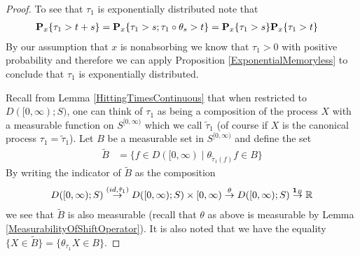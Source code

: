\begin{proof}
To see that $\tau_1$ is exponentially distributed note that
\begin{align*}
\sprobability{\tau_1 > t+s}{x} &= \sprobability{\tau_1 > s; \tau_1
  \circ \theta_s > t}{x} = \sprobability{\tau_1 > s}{x} \sprobability{\tau_1 > t}{x} 
\end{align*}
By our assumption that $x$ is nonabsorbing we know that $\tau_1 > 0$
with positive probability and therefore we can apply Proposition
\ref{ExponentialMemoryless} to conclude that $\tau_1$ is
exponentially distributed.

Recall from Lemma
\ref{HittingTimesContinuous} that when restricted to
$D([0,\infty);S)$, one can think of $\tau_1$
as being a composition of the process $X$ with a measurable function on
$S^{[0,\infty)}$ which we call $\tilde{\tau}_1$
(of course if $X$ is the canonical process $\tau_1=\tilde{\tau}_1$).  
Let $B$ be a measurable set in $S^{[0,\infty)}$ and define the set
\begin{align*}
\tilde{B} &= \lbrace f \in D([0,\infty) \mid \theta_{\tilde{\tau}_1(f)} f \in
B \rbrace
\end{align*}
By writing the indicator of $\tilde{B}$
as the composition 
\begin{align*}
D([0,\infty) ; S) \overset{(id, \tilde{\tau}_1)}  \to D([0,\infty) ; S) \times
[0, \infty)
\overset{\theta} \to D([0,\infty) ; S) \overset{\characteristic{B}}
\to \reals
\end{align*}
we see that $\tilde{B}$ is also measurable
(recall that $\theta$ as above is measurable by Lemma
\ref{MeasurabilityOfShiftOperator}).  It is also noted that we have
the equality $\lbrace X \in \tilde{B} \rbrace = \lbrace
\theta_{\tau_1} X \in B \rbrace$.


\end{proof}
